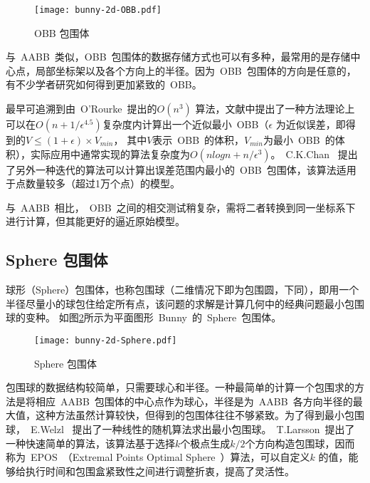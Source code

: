 \begin{figure}[htbp] %
  \centering
  \texttt{[image: bunny-2d-OBB.pdf]}
  \caption{OBB 包围体}
  \label{fig:obb-bunny}
\end{figure}

与~AABB~类似，OBB~包围体的数据存储方式也可以有多种，最常用的是存储中心点，局部坐标架以及各个方向上的半径\cite{gottschalk1996obbtree}。因为~OBB~包围体的方向是任意的，有不少学者研究如何得到更加紧致的~OBB。

最早可追溯到由~O'Rourke~\cite{o1985finding}提出的$O(n^3)$
算法，文献中提出了一种方法理论上可以在$O(n
+ 1/ \epsilon ^{4.5} )$复杂度内计算出一个近似最小~OBB（$\epsilon$
为近似误差，即得到的$V\leq(1+\epsilon)\times V_{min}$，
其中$V$表示~OBB~的体积，$V_{min}$为最小~OBB~的体积），实际应用中通常实现的算法复杂度为$O(nlogn + n/
\epsilon ^{3} )$。~C.K.Chan~ \cite{chan2001determination}
提出了另外一种迭代的算法可以计算出误差范围内最小的~OBB~包围体，该算法适用于点数量较多（超过1万个点）的模型。

与~AABB~相比，~OBB~之间的相交测试稍复杂，需将二者转换到同一坐标系下进行计算，但其能更好的逼近原始模型。

\subsection{Sphere 包围体}

球形（Sphere）包围体，也称包围球（二维情况下即为包围圆，下同），即用一个半径尽量小的球包住给定所有点，该问题的求解是计算几何中的经典问题最小包围球的变种。
如图\ref{fig:sphere-bunny}所示为平面图形~Bunny~的~Sphere~包围体。

\begin{figure}[htbp] %
  \centering
  \texttt{[image: bunny-2d-Sphere.pdf]}
  \caption{Sphere 包围体}
  \label{fig:sphere-bunny}
\end{figure}

包围球的数据结构较简单，只需要球心和半径。一种最简单的计算一个包围求的方法是将相应~AABB~包围体的中心点作为球心，半径是为~AABB~各方向半径的最大值，这种方法虽然计算较快，但得到的包围体往往不够紧致。为了得到最小包围球，~E.Welzl~\cite{Welzl1991Smallest}
提出了一种线性的随机算法求出最小包围球。~T.Larsson~\cite{larsson2008fast}提出了一种快速简单的算法，该算法基于选择$k$个极点生成$k/2$个方向构造包围球，因而称为~EPOS~（Extremal Points Optimal Sphere~）算法，可以自定义$k$ 的值，能够给执行时间和包围盒紧致性之间进行调整折衷，提高了灵活性。

